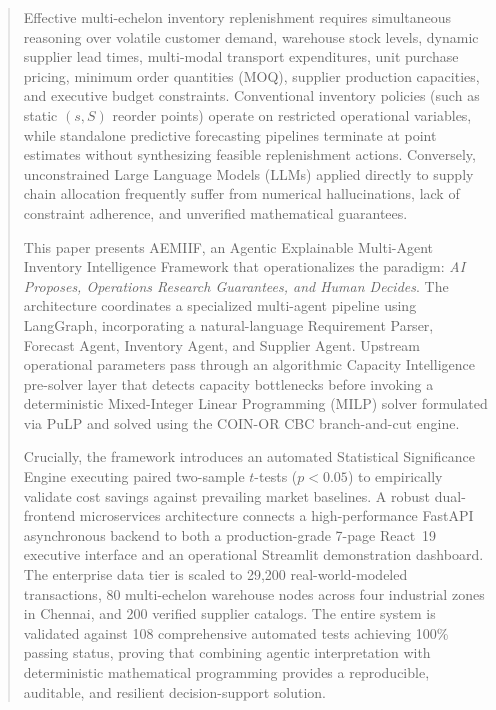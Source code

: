\documentclass[conference]{IEEEtran}
\begin{document}
\begin{abstract}
Effective multi-echelon inventory replenishment requires simultaneous reasoning over volatile customer demand, warehouse stock levels, dynamic supplier lead times, multi-modal transport expenditures, unit purchase pricing, minimum order quantities (MOQ), supplier production capacities, and executive budget constraints. Conventional inventory policies (such as static $(s, S)$ reorder points) operate on restricted operational variables, while standalone predictive forecasting pipelines terminate at point estimates without synthesizing feasible replenishment actions. Conversely, unconstrained Large Language Models (LLMs) applied directly to supply chain allocation frequently suffer from numerical hallucinations, lack of constraint adherence, and unverified mathematical guarantees.

This paper presents AEMIIF, an Agentic Explainable Multi-Agent Inventory Intelligence Framework that operationalizes the paradigm: \textit{AI Proposes, Operations Research Guarantees, and Human Decides}. The architecture coordinates a specialized multi-agent pipeline using LangGraph, incorporating a natural-language Requirement Parser, Forecast Agent, Inventory Agent, and Supplier Agent. Upstream operational parameters pass through an algorithmic Capacity Intelligence pre-solver layer that detects capacity bottlenecks before invoking a deterministic Mixed-Integer Linear Programming (MILP) solver formulated via PuLP and solved using the COIN-OR CBC branch-and-cut engine.

Crucially, the framework introduces an automated Statistical Significance Engine executing paired two-sample $t$-tests ($p < 0.05$) to empirically validate cost savings against prevailing market baselines. A robust dual-frontend microservices architecture connects a high-performance FastAPI asynchronous backend to both a production-grade 7-page React~19 executive interface and an operational Streamlit demonstration dashboard. The enterprise data tier is scaled to 29,200 real-world-modeled transactions, 80 multi-echelon warehouse nodes across four industrial zones in Chennai, and 200 verified supplier catalogs. The entire system is validated against 108 comprehensive automated tests achieving 100\% passing status, proving that combining agentic interpretation with deterministic mathematical programming provides a reproducible, auditable, and resilient decision-support solution.
\end{abstract}
\end{document}
